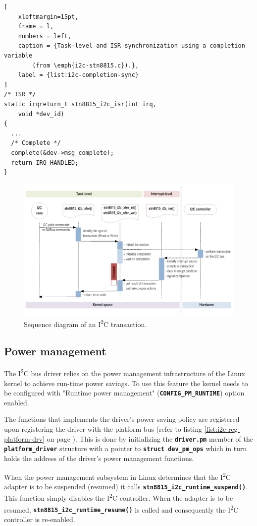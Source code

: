 \documentclass[a4paper,10pt]{article}
\newcommand{\icc}{I\textsuperscript{2}C }
\newcommand{\keyword}[1]{\texttt{\textbf{#1}}}
\begin{document}
\begin{multicols}{2}
\begin{lstlisting}[
	xleftmargin=15pt,
	frame = l,
	numbers = left,
	caption = {Task-level and ISR synchronization using a completion variable
		(from \emph{i2c-stn8815.c}).},
	label = {list:i2c-completion-sync}
]
/* ISR */
static irqreturn_t stn8815_i2c_isr(int irq,
	void *dev_id)
{
  ...
  /* Complete */
  complete(&dev->msg_complete);
  return IRQ_HANDLED;
}

\end{lstlisting}

\begin{figure}
 \centering
 \includegraphics[width=16cm]
 	{./figures/i2c-data-transfer-seq-diag.png}
 \caption{Sequence diagram of an \icc transaction.}
 \label{fig:i2c-trans-seq-diag}
\end{figure}


\subsection{Power management}
\label{sec:adapter_power_management}

The \icc bus driver relies on the power management infrastructure of the Linux
kernel to achieve run-time power savings. To use this feature the kernel needs
to be configured with "Runtime power management" (\keyword{CONFIG\_PM\_RUNTIME})
option enabled.

The functions that implements the driver's power saving policy are registered
upon registering the driver with the platform bus (refer to listing
\ref{list:i2c-reg-platform-drv} on page \pageref{list:i2c-reg-platform-drv}).
This is done by initializing the \keyword{driver.pm} member of the
\keyword{platform\_driver} structure with a pointer to
\keyword{struct dev\_pm\_ops} which in turn holds the address of the driver's
power management functions.

When the power management subsystem in Linux determines that the \icc adapter
is to be suspended (resumed) it calls \keyword{stn8815\_i2c\_runtime\_suspend()}.
This function simply disables the \icc controller.  
When the adapter is to be resumed, \keyword{stn8815\_i2c\_runtime\_resume()} is called and consequently the \icc controller is re-enabled.


\end{multicols}
\end{document}
